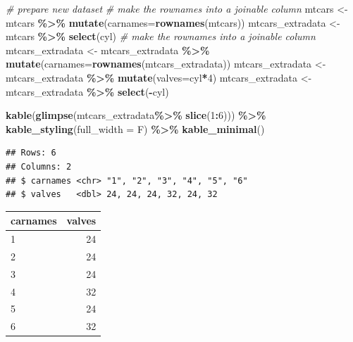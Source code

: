 \documentclass[
]{article}
\newenvironment{Shaded}{\begin{snugshade}}{\end{snugshade}}
\newcommand{\AttributeTok}[1]{\textcolor[rgb]{0.13,0.29,0.53}{#1}}
\newcommand{\CommentTok}[1]{\textcolor[rgb]{0.56,0.35,0.01}{\textit{#1}}}
\newcommand{\DecValTok}[1]{\textcolor[rgb]{0.00,0.00,0.81}{#1}}
\newcommand{\FunctionTok}[1]{\textcolor[rgb]{0.13,0.29,0.53}{\textbf{#1}}}
\newcommand{\NormalTok}[1]{#1}
\newcommand{\OtherTok}[1]{\textcolor[rgb]{0.56,0.35,0.01}{#1}}
\newcommand{\SpecialCharTok}[1]{\textcolor[rgb]{0.81,0.36,0.00}{\textbf{#1}}}
\begin{document}
\begin{Shaded}
\begin{Highlighting}[]
\CommentTok{\# prepare new dataset}
\CommentTok{\# make the rownames into a \textquotesingle{}joinable\textquotesingle{} column}
\NormalTok{mtcars }\OtherTok{\textless{}{-}}\NormalTok{ mtcars }\SpecialCharTok{\%\textgreater{}\%} \FunctionTok{mutate}\NormalTok{(}\AttributeTok{carnames=}\FunctionTok{rownames}\NormalTok{(mtcars)) }
\NormalTok{mtcars\_extradata }\OtherTok{\textless{}{-}}\NormalTok{ mtcars }\SpecialCharTok{\%\textgreater{}\%} \FunctionTok{select}\NormalTok{(cyl)}
\CommentTok{\# make the rownames into a \textquotesingle{}joinable\textquotesingle{} column}
\NormalTok{mtcars\_extradata }\OtherTok{\textless{}{-}}\NormalTok{ mtcars\_extradata }\SpecialCharTok{\%\textgreater{}\%}
\FunctionTok{mutate}\NormalTok{(}\AttributeTok{carnames=}\FunctionTok{rownames}\NormalTok{(mtcars\_extradata)) }
\NormalTok{mtcars\_extradata }\OtherTok{\textless{}{-}}\NormalTok{ mtcars\_extradata }\SpecialCharTok{\%\textgreater{}\%} \FunctionTok{mutate}\NormalTok{(}\AttributeTok{valves=}\NormalTok{cyl}\SpecialCharTok{*}\DecValTok{4}\NormalTok{)}
\NormalTok{mtcars\_extradata }\OtherTok{\textless{}{-}}\NormalTok{ mtcars\_extradata }\SpecialCharTok{\%\textgreater{}\%} \FunctionTok{select}\NormalTok{(}\SpecialCharTok{{-}}\NormalTok{cyl)}

\FunctionTok{kable}\NormalTok{(}\FunctionTok{glimpse}\NormalTok{(mtcars\_extradata}\SpecialCharTok{\%\textgreater{}\%} \FunctionTok{slice}\NormalTok{(}\DecValTok{1}\SpecialCharTok{:}\DecValTok{6}\NormalTok{))) }\SpecialCharTok{\%\textgreater{}\%}  
  \FunctionTok{kable\_styling}\NormalTok{(}\AttributeTok{full\_width =}\NormalTok{ F) }\SpecialCharTok{\%\textgreater{}\%}
  \FunctionTok{kable\_minimal}\NormalTok{()}
\end{Highlighting}
\end{Shaded}

\begin{verbatim}
## Rows: 6
## Columns: 2
## $ carnames <chr> "1", "2", "3", "4", "5", "6"
## $ valves   <dbl> 24, 24, 24, 32, 24, 32
\end{verbatim}

\begin{table}
\centering
\begin{tabular}{l|r}
\hline
carnames & valves\\
\hline
1 & 24\\
\hline
2 & 24\\
\hline
3 & 24\\
\hline
4 & 32\\
\hline
5 & 24\\
\hline
6 & 32\\
\hline
\end{tabular}
\end{table}
\end{document}
